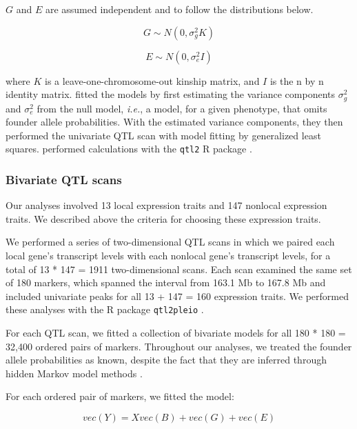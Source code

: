 \documentclass{article}
\begin{document}
\begin{boehm}
$G$ and $E$ are assumed independent and to follow the distributions below.

\begin{equation}
    G \sim N(0, \sigma^2_gK)
\end{equation}

\begin{equation}
    E \sim N(0, \sigma^2_eI)
\end{equation}

where $K$ is a leave-one-chromosome-out kinship matrix, and $I$ is the n by n identity matrix. \citet{keller2018genetic} fitted the models by first estimating the variance components $\sigma^2_g$ and $\sigma^2_e$ from the null model, \emph{i.e.}, a model, for a given phenotype, that omits founder allele probabilities. With the estimated variance components, they then performed the univariate QTL scan with model fitting by generalized least squares. \citet{keller2018genetic} performed calculations with the \texttt{qtl2} R package \citep{Broman2018}.



\subsubsection{Bivariate QTL scans}

Our analyses involved 13 local expression traits and 147 nonlocal expression traits. We described above the criteria for choosing these expression traits.

We performed a series of two-dimensional QTL scans in which we paired each local gene's transcript levels with each nonlocal gene's transcript levels, for a total of 13 * 147 = 1911 two-dimensional scans. Each scan examined the same set of 180 markers, which spanned the interval from 163.1 Mb to 167.8 Mb and included univariate peaks for all 13 + 147 = 160 expression traits. We performed these analyses with the R package \texttt{qtl2pleio} \citep{qtl2pleio}.

For each QTL scan, we fitted a collection of bivariate models for all 180 * 180 = 32,400 ordered pairs of markers. Throughout our analyses, we treated the founder allele probabilities as known, despite the fact that they are inferred through hidden Markov model methods \citep{broman2012genotype, broman2012haplotype, Broman2018}.

For each ordered pair of markers, we fitted the model:

\begin{equation}
    vec(Y) = Xvec(B) + vec(G) + vec(E)
    \label{eqn:bivariate-model}
\end{equation}


\end{boehm}
\end{document}
